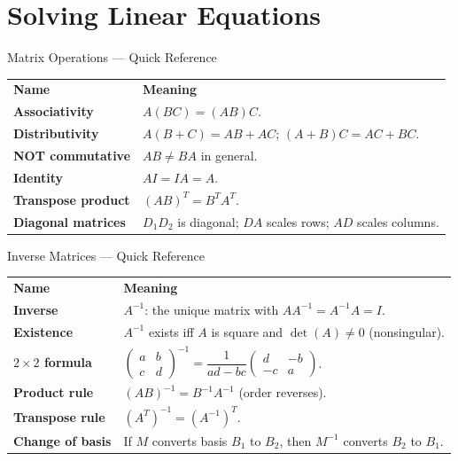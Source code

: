 

\section{Solving Linear Equations}

\begin{toolkitbox}{Matrix Operations --- Quick Reference}
\begin{tabular}{@{}p{}p{}@{}}
\textbf{Name} & \textbf{Meaning} \\
\textbf{Associativity}    & $A(BC) = (AB)C$. \\[4pt]
\textbf{Distributivity}   & $A(B+C) = AB + AC$; $(A+B)C = AC + BC$. \\[4pt]
\textbf{NOT commutative}  & $AB \neq BA$ in general. \\[4pt]
\textbf{Identity}         & $AI = IA = A$. \\[4pt]
\textbf{Transpose product}& $(AB)^T = B^T A^T$. \\[4pt]
\textbf{Diagonal matrices}& $D_1 D_2$ is diagonal; $DA$ scales rows; $AD$ scales columns. \\
\end{tabular}
\end{toolkitbox}


\begin{toolkitbox}{Inverse Matrices --- Quick Reference}
\begin{tabular}{@{}p{}p{}@{}}
\textbf{Name} & \textbf{Meaning} \\
\textbf{Inverse}          & $A^{-1}$: the unique matrix with $AA^{-1} = A^{-1}A = I$. \\[4pt]
\textbf{Existence}        & $A^{-1}$ exists iff $A$ is square and $\det(A) \neq 0$ (nonsingular). \\[4pt]
\textbf{$2\times 2$ formula} & $\begin{pmatrix} a & b \\ c & d \end{pmatrix}^{-1} = \dfrac{1}{ad-bc}\begin{pmatrix} d & -b \\ -c & a \end{pmatrix}$. \\[8pt]
\textbf{Product rule}     & $(AB)^{-1} = B^{-1}A^{-1}$ (order reverses). \\[4pt]
\textbf{Transpose rule}   & $(A^T)^{-1} = (A^{-1})^T$. \\[4pt]
\textbf{Change of basis}  & If $M$ converts basis $B_1$ to $B_2$, then $M^{-1}$ converts $B_2$ to $B_1$. \\
\end{tabular}
\end{toolkitbox}


